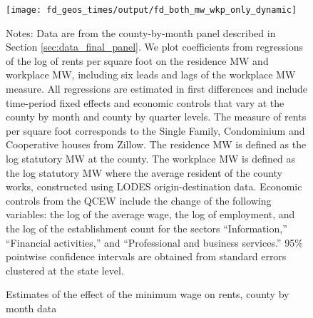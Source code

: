
\begin{figure}[h!]
    \centering
    \caption{Estimates of the effect of the minimum wage on rents, county by month data}
    \label{fig:dynamic_county_month}

	\texttt{[image: fd\_geos\_times/output/fd\_both\_mw\_wkp\_only\_dynamic]}

    \begin{minipage}{.95\textwidth} \footnotesize
        \vspace{3mm}
        Notes:
        Data are from the county-by-month panel described in Section 
        \ref{sec:data_final_panel}.
        We plot coefficients from regressions of the log of rents per
        square foot on the residence MW and workplace MW, including 
        six leads and lags of the workplace MW measure.
        All regressions are estimated in first differences and include 
        time-period fixed effects and economic controls that vary at the 
        county by month and county by quarter levels.
        The measure of rents per square foot corresponds to the Single Family, 
        Condominium and Cooperative houses from Zillow.
        The residence MW is defined as the log statutory MW at the county.
        The workplace MW is defined as the log statutory MW where the average 
        resident of the county works, constructed using LODES 
        origin-destination data.
        Economic controls from the QCEW include the change of the following 
        variables: the log of the average wage, the log of employment, and the 
        log of the establishment count for the sectors ``Information,'' 
        ``Financial activities,'' and ``Professional and business services.''
        95\% pointwise confidence intervals are obtained from standard errors 
        clustered at the state level.
    \end{minipage}
\end{figure}
